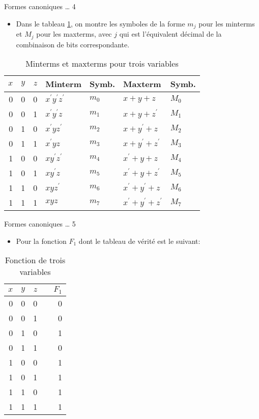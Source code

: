 \documentclass[presentation]{beamer}
\begin{document}
\begin{frame}[label={sec:org9a6926d}]{Formes canoniques \ldots{} 4}
\begin{itemize}
\item Dans le tableau \ref{tab:org21d1091}, on montre les symboles de la forme \(m_j\) pour les minterms et \(M_j\) pour les maxterms, avec \(j\) qui est l'équivalent décimal de la combinaison de bits correspondante.
\end{itemize}

\begin{table}[htbp]
\caption{\label{tab:org21d1091}Minterms et maxterms pour trois variables}
\centering
\begin{tabular}{rrrllll}
\(x\) & \(y\) & \(z\) & Minterm & Symb. & Maxterm & Symb.\\[0pt]
\hline
0 & 0 & 0 & \(x^\prime y^\prime z^\prime\) & \(m_0\) & \(x+ y+ z\) & \(M_0\)\\[0pt]
0 & 0 & 1 & \(x^\prime y^\prime z\) & \(m_1\) & \(x+ y+ z^\prime\) & \(M_1\)\\[0pt]
0 & 1 & 0 & \(x^\prime y z^\prime\) & \(m_2\) & \(x+ y^\prime+ z\) & \(M_2\)\\[0pt]
0 & 1 & 1 & \(x^\prime y z\) & \(m_3\) & \(x+ y^\prime+ z^\prime\) & \(M_3\)\\[0pt]
1 & 0 & 0 & \(x y^\prime z^\prime\) & \(m_4\) & \(x^\prime+ y+ z\) & \(M_4\)\\[0pt]
1 & 0 & 1 & \(x y^\prime z\) & \(m_5\) & \(x^\prime+ y+ z^\prime\) & \(M_5\)\\[0pt]
1 & 1 & 0 & \(x y z^\prime\) & \(m_6\) & \(x^\prime+ y^\prime+ z\) & \(M_6\)\\[0pt]
1 & 1 & 1 & \(x y z\) & \(m_7\) & \(x^\prime + y^\prime+ z^\prime\) & \(M_7\)\\[0pt]
\end{tabular}
\end{table}
\end{frame}

\begin{frame}[label={sec:org7a9657a}]{Formes canoniques \ldots{} 5}
\begin{itemize}
\item Pour la fonction \(F_1\) dont le tableau de vérité est le suivant:
\end{itemize}

\begin{table}[htbp]
\caption{\label{tab:org66c8c44}Fonction de trois variables}
\centering
\begin{tabular}{rrrlr}
\(x\) & \(y\) & \(z\) &  & \(F_1\)\\[0pt]
\hline
0 & 0 & 0 &  & 0\\[0pt]
0 & 0 & 1 &  & 0\\[0pt]
0 & 1 & 0 &  & 1\\[0pt]
0 & 1 & 1 &  & 0\\[0pt]
1 & 0 & 0 &  & 1\\[0pt]
1 & 0 & 1 &  & 1\\[0pt]
1 & 1 & 0 &  & 1\\[0pt]
1 & 1 & 1 &  & 1\\[0pt]
\end{tabular}
\end{table}
\end{frame}
\end{document}
